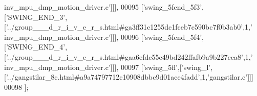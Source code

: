 \begin{DoxyCode}
{      inv\_mpu\_dmp\_motion\_driver.c'}]]],
00095   [\textcolor{stringliteral}{'swing\_5fend\_5f3'},[\textcolor{stringliteral}{'SWING\_END\_3'},[\textcolor{stringliteral}{'../group\_\_\_d\_r\_i\_v\_e\_r\_s.html#ga3ff31c1255dc1fceb7c590bc7f0b3ab0'},1,\textcolor{stringliteral}{'
      inv\_mpu\_dmp\_motion\_driver.c'}]]],
00096   [\textcolor{stringliteral}{'swing\_5fend\_5f4'},[\textcolor{stringliteral}{'SWING\_END\_4'},[\textcolor{stringliteral}{'../group\_\_\_d\_r\_i\_v\_e\_r\_s.html#gaa6efdc55c49bd242ffafb9a9b227cca8'},1,\textcolor{stringliteral}{'
      inv\_mpu\_dmp\_motion\_driver.c'}]]],
00097   [\textcolor{stringliteral}{'swing\_5fl'},[\textcolor{stringliteral}{'swing\_l'},[\textcolor{stringliteral}{'../gangstilar\_8c.html#a9a74797712c10908dbbc9d01ace4fadd'},1,\textcolor{stringliteral}{'gangstilar.c'}]]]
00098 ];
\end{DoxyCode}
